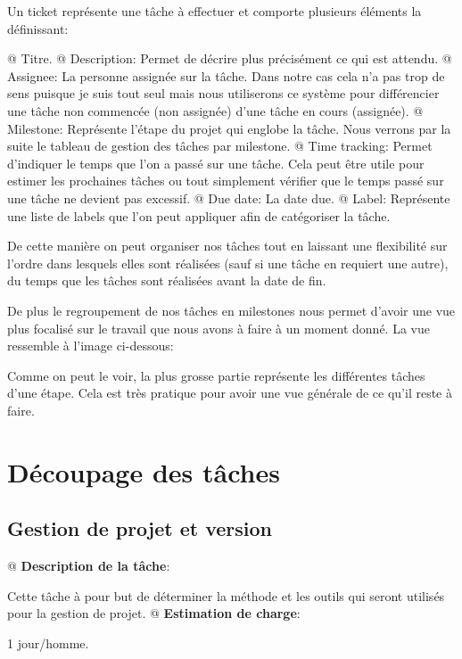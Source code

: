\documentclass[final]{polytech/polytech}
\begin{document}
		Un ticket représente une tâche à effectuer et comporte plusieurs éléments la définissant:
		\begin{easylist}
			@ Titre.
			@ Description: Permet de décrire plus précisément ce qui est attendu.
			@ Assignee: La personne assignée sur la tâche. Dans notre cas cela n'a pas trop de sens puisque je suis tout seul mais nous utiliserons ce système pour différencier une tâche non commencée (non assignée) d'une tâche en cours (assignée).
			@ Milestone: Représente l'étape du projet qui englobe la tâche. Nous verrons par la suite le tableau de gestion des tâches par milestone.
			@ Time tracking: Permet d'indiquer le temps que l'on a passé sur une tâche. Cela peut être utile pour estimer les prochaines tâches ou tout simplement vérifier que le temps passé sur une tâche ne devient pas excessif.
			@ Due date: La date due.
			@ Label: Représente une liste de labels que l'on peut appliquer afin de catégoriser la tâche.
		\end{easylist}
		
		De cette manière on peut organiser nos tâches tout en laissant une flexibilité sur l'ordre dans lesquels elles sont réalisées (sauf si une tâche en requiert une autre), du temps que les tâches sont réalisées avant la date de fin.
		
		De plus le regroupement de nos tâches en milestones nous permet d'avoir une vue plus focalisé sur le travail que nous avons à faire à un moment donné.
		La vue ressemble à l'image ci-dessous:
		
		Comme on peut le voir, la plus grosse partie représente les différentes tâches d'une étape. Cela est très pratique pour avoir une vue générale de ce qu'il reste à faire.
	
	\section{Découpage des tâches}
		\subsection{Gestion de projet et version}
			\begin{easylist}
				@ \textbf{Description de la tâche}:
				
				Cette tâche à pour but de déterminer la méthode et les outils qui seront utilisés pour la gestion de projet.
				@ \textbf{Estimation de charge}:
				
				1 jour/homme.
			\end{easylist}
			
\end{document}
